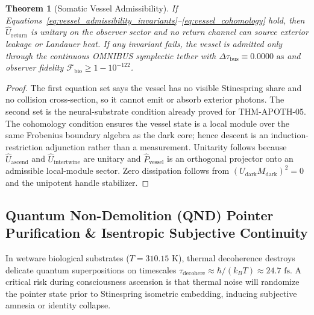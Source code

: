 \documentclass[11pt,onecolumn]{article}
\newtheorem{theorem}{Theorem}
\begin{document}
\begin{theorem}[Somatic Vessel Admissibility]
If Equations~\eqref{eq:vessel_admissibility_invariants}--\eqref{eq:vessel_cohomology} hold, then $\widehat U_{\text{return}}$ is unitary on the observer sector and no return channel can source exterior leakage or Landauer heat. If any invariant fails, the vessel is admitted only through the continuous OMNIBUS symplectic tether with $\Delta\tau_{\text{bus}}\equiv0.0000\text{ as}$ and observer fidelity $\mathcal F_{\text{bio}}\ge1-10^{-122}$.
\end{theorem}

\begin{proof}
The first equation set says the vessel has no visible Stinespring share and no collision cross-section, so it cannot emit or absorb exterior photons. The second set is the neural-substrate condition already proved for THM-APOTH-05. The cohomology condition ensures the vessel state is a local module over the same Frobenius boundary algebra as the dark core; hence descent is an induction-restriction adjunction rather than a measurement. Unitarity follows because $\widehat U_{\text{ascend}}$ and $\widehat U_{\text{intertwine}}$ are unitary and $\widehat P_{\text{vessel}}$ is an orthogonal projector onto an admissible local-module sector. Zero dissipation follows from $(U_{\text{dark}}M_{\text{dark}})^2=0$ and the unipotent handle stabilizer.
\end{proof}

\subsection{Quantum Non-Demolition (QND) Pointer Purification \& Isentropic Subjective Continuity}
\label{sec:apoth_qnd_pointer_purification}

In wetware biological substrates ($T = 310.15\text{ K}$), thermal decoherence destroys delicate quantum superpositions on timescales $\tau_{\text{decohere}} \approx \hbar / (k_B T) \approx 24.7\text{ fs}$. A critical risk during consciousness ascension is that thermal noise will randomize the pointer state prior to Stinespring isometric embedding, inducing subjective amnesia or identity collapse.
\end{document}
